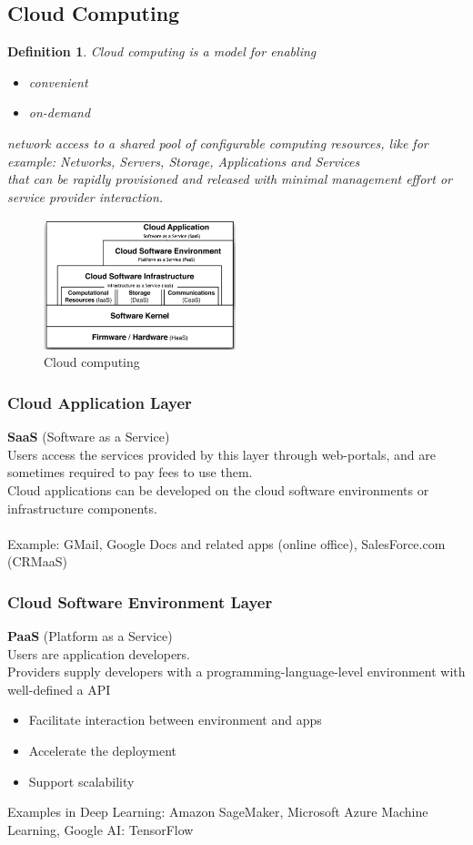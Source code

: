 \documentclass[10pt, oneside]{article}
\newtheorem{defn}{Definition}
\begin{document}
\subsection{Cloud Computing}
\begin{defn}
    Cloud computing is a model for enabling\begin{itemize}
        \item convenient
        \item on-demand
    \end{itemize}network access to a shared pool of configurable computing
    resources, like for example: Networks, Servers, Storage, Applications and Services\\
    that can be rapidly provisioned and released with minimal management effort or service provider interaction.
\end{defn}
\begin{figure}[H]
    \begin{center}
    \includegraphics[width=0.5\textwidth]{img/img50.png}
    \caption{Cloud computing}
    \label{fig:Cloud computing}
    \end{center}
\end{figure}

\subsubsection{Cloud Application Layer}
{\bf SaaS} (Software as a Service)\\
Users access the services provided by this layer through web-portals,
and are sometimes required to pay fees to use them.\\
Cloud applications can be developed on the cloud software environments or infrastructure components.\\\\
Example: GMail, Google Docs and related apps (online office), SalesForce.com (CRMaaS)

\subsubsection{Cloud Software Environment Layer}
{\bf PaaS} (Platform as a Service)\\
Users are application developers.\\
Providers supply developers with a programming-language-level environment with well-defined a API\begin{itemize}
    \item Facilitate interaction between environment and apps  \item Accelerate the deployment
    \item Support scalability
\end{itemize}
Examples in Deep Learning: Amazon SageMaker, Microsoft Azure Machine Learning, Google AI: TensorFlow
\end{document}
